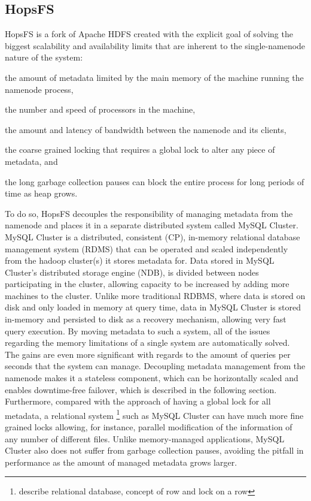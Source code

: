 \subsection{HopsFS}
\label{sec:hopsfs}
HopsFS \cite{DBLP:conf/fast/NiaziIHDGR17} is a fork of Apache HDFS created with the explicit goal of solving the biggest scalability and availability limits that are inherent to the single-namenode nature of the system: 
\begin{inparaenum}[i)]
    \item the amount of metadata limited by the main memory of the machine running the namenode process,
    \item the number and speed of processors in the machine,
    \item the amount and latency of bandwidth between the namenode and its clients,
    \item the coarse grained locking that requires a global lock to alter any piece of metadata, and
    \item the long garbage collection pauses can block the entire process for long periods of time as heap grows.
\end{inparaenum}
To do so, HopsFS decouples the responsibility of managing metadata from the namenode and places it in a separate distributed system called MySQL Cluster.
MySQL Cluster is a distributed, consistent (CP), in-memory relational database management system (RDMS) that can be operated and scaled independently from the hadoop cluster(s) it stores metadata for.
Data stored in MySQL Cluster's distributed storage engine (NDB), is divided between nodes participating in the cluster, allowing capacity to be increased by adding more machines to the cluster.
Unlike more traditional RDBMS, where data is stored on disk and only loaded in memory at query time, data in MySQL Cluster is stored in-memory and persisted to disk as a recovery mechanism, allowing very fast query execution.
By moving metadata to such a system, all of the issues regarding the memory limitations of a single system are automatically solved.
The gains are even more significant with regards to the amount of queries per seconds that the system can manage.
Decoupling metadata management from the namenode makes it a stateless component, which can be horizontally scaled and enables downtime-free failover, which is described in the following section.
Furthermore, compared with the approach of having a global lock for all metadata, a relational system \footnote{describe relational database, concept of row and lock on a row} such as MySQL Cluster can have much more fine grained locks allowing, for instance, parallel modification of the information of any number of different files.
Unlike memory-managed applications, MySQL Cluster also does not suffer from garbage collection pauses, avoiding the pitfall in performance as the amount of managed metadata grows larger.

